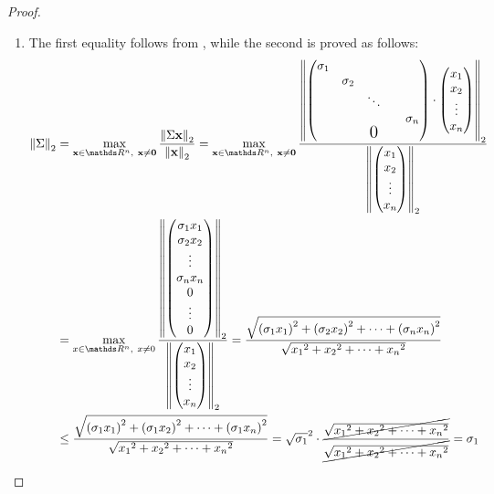 \documentclass[computationalMathematics.tex]{subfiles}
\begin{document}
\begin{proof}
  \begin{enumerate}
    \item The first equality follows from , while the second is proved as follows:
  \begin{equation}
    \begin{split}
      \norm{\Sigma}_2 &=
	    \max\limits_{\vect{x} \in \R^n,~\vect{x} \neq \vect{0}}\frac{\norm{\Sigma \vect{x}}_2}{\norm{\vect{x}}_2} =
	    \max\limits_{\vect{x} \in \R^n,~\vect{x} \neq \vect{0}}\frac{\norm{\begin{pmatrix}
	    \sigma_1\\
	    & \sigma_2\\
	    && \ddots\\
	    &&&& \sigma_n\\
	      &&\text{\Large 0}&&\\
	    \end{pmatrix}
	    \cdot 
	    \begin{pmatrix}
	      x_1\\
	      x_2\\
	      \vdots\\
	      x_n\\
	    \end{pmatrix}}_2}
	      {\norm{\begin{pmatrix}
	      x_1\\
	      x_2\\
	      \vdots\\
	      x_n\\
	    \end{pmatrix}}_2}\\
    &=
      \max\limits_{x \in \R^n,~x \neq 0}\frac{\norm{\begin{pmatrix}
      \sigma_1 x_1\\
      \sigma_2 x_2\\
      \vdots\\
      \sigma_n x_n\\
      0\\
      \vdots\\
      0\\
      \end{pmatrix}}_2}
      {\norm{\begin{pmatrix}
      x_1\\
      x_2\\
      \vdots\\
      x_n\\
      \end{pmatrix}}_2}
    =
    	\frac{\sqrt{{(\sigma_1 x_1)}^2 + {(\sigma_2 x_2)}^2 + \cdots +{(\sigma_n x_n)}^2}}{\sqrt{{x_1}^2 + {x_2}^2 + \cdots +{x_n}^2}}\\
    &\le 
		\frac{\sqrt{{(\sigma_1 x_1)}^2 + {(\sigma_1 x_2)}^2 + \cdots +{(\sigma_1 x_n)}^2}}{\sqrt{{x_1}^2 + {x_2}^2 + \cdots +{x_n}^2}}
	=
    \sqrt{\sigma_1}^2 \cdot \frac{\cancel{\sqrt{{x_1}^2 + {x_2}^2 + \cdots +{x_n}^2}}}{\cancel{\sqrt{{x_1}^2 + {x_2}^2 + \cdots +{x_n}^2}}}
      = \sigma_1
  \end{split}
  \end{equation}


\end{enumerate}
\end{proof}
\end{document}
